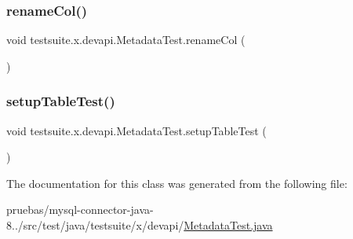\subsubsection{\texorpdfstring{rename\+Col()}{renameCol()}}
{\footnotesize\ttfamily void testsuite.\+x.\+devapi.\+Metadata\+Test.\+rename\+Col (\begin{DoxyParamCaption}{ }\end{DoxyParamCaption})}

\mbox{\label{classtestsuite_1_1x_1_1devapi_1_1_metadata_test_aa25935980cc3f97ca8c9ca4fd31a615d}} 
\subsubsection{\texorpdfstring{setup\+Table\+Test()}{setupTableTest()}}
{\footnotesize\ttfamily void testsuite.\+x.\+devapi.\+Metadata\+Test.\+setup\+Table\+Test (\begin{DoxyParamCaption}{ }\end{DoxyParamCaption})}



The documentation for this class was generated from the following file\+:\begin{DoxyCompactItemize}
\item 
pruebas/mysql-\/connector-\/java-\/8../src/test/java/testsuite/x/devapi/\mbox{\hyperlink{x_2devapi_2_metadata_test_8java}{Metadata\+Test.\+java}}\end{DoxyCompactItemize}
